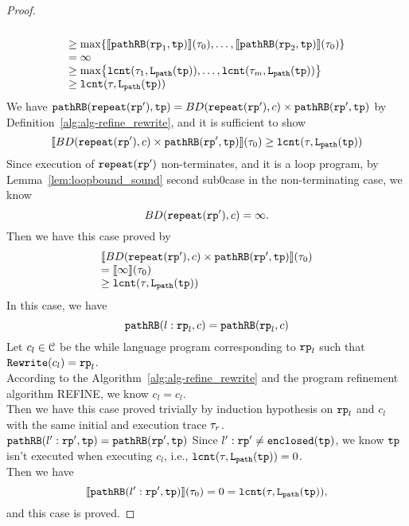 \begin{proof}
\[\begin{array}{l}
    \\
    \geq \max\left\{ \econfig{\inoutB(\rprog_1, \tpath)}(\trace_0), \ldots, \econfig{\inoutB(\rprog_2, \tpath)}(\trace_0)\right\}
    \\
    =  \infty
    \\
    \geq \max\left\{ \lcounter(\trace_1,  \pathl(\tpath)),  \ldots, \lcounter(\trace_m,  \pathl(\tpath))  \right\}
    \\
    \geq \lcounter(\trace, \pathl(\tpath))
    \end{array}
  \]
We have $\mathtt{pathRB}(\mathtt{repeat}(\mathtt{rp}'), \mathtt{tp}) = BD(\mathtt{repeat}(\mathtt{rp}'), c) \times \mathtt{pathRB}(\mathtt{rp}', \mathtt{tp})$
by Definition~\ref{alg:alg-refine_rewrite}, and
it is sufficient to show
\[
  \llbracket  BD(\mathtt{repeat}(\mathtt{rp}'), c) \times \mathtt{pathRB}(\mathtt{rp}', \mathtt{tp}) \rrbracket (\mathtt{\tau}_0) \geq \mathtt{lcnt}(\mathtt{\tau}, \mathtt{L}_{\mathtt{path}}(\mathtt{tp})) 
\]
Since execution of $\mathtt{repeat}(\mathtt{rp}')$ non-terminates, and it is a loop program,
by Lemma~\ref{lem:loopbound_sound} second sub0case in the non-terminating case, we know
\[
  BD(\mathtt{repeat}(\mathtt{rp}'), c) = \infty.
\]
Then we have this case proved by
\[
  \begin{array}{l}
  \llbracket BD(\mathtt{repeat}(\mathtt{rp}'), c) \times \mathtt{pathRB}(\mathtt{rp}', \mathtt{tp}) \rrbracket(\mathtt{\tau}_0) 
  \\
  =
  \llbracket  \infty  \rrbracket(\mathtt{\tau}_0) 
  \\
  \geq \mathtt{lcnt}(\mathtt{\tau}, \mathtt{L}_{\mathtt{path}}(\mathtt{tp})) 
  \end{array}
  \]
  In this case, we have
  \[
    \mathtt{pathRB}(l: \mathtt{rp}_l, c) = \mathtt{pathRB}(\mathtt{rp}_l, c)
  \]
  Let $c_l \in \mathcal{C}$ be the while language program corresponding to $\mathtt{rp}_l$ such that $\mathtt{Rewrite}(c_l) = \mathtt{rp}_l$.
  \\
  According to the Algorithm~\ref{alg:alg-refine_rewrite} and the program refinement algorithm REFINE, we know
  $c_l = c_l$.
  \\
  Then we have this case proved trivially by induction hypothesis on $\mathtt{rp}_l$ and $c_l$ with the same initial and execution trace $\mathtt{\tau}_r$.
$\mathtt{pathRB}(l': \mathtt{rp}', \mathtt{tp}) = \mathtt{pathRB}(\mathtt{rp}', \mathtt{tp})$ 
Since $l': \mathtt{rp}' \neq \mathtt{enclosed}(\mathtt{tp})$, we know $\mathtt{tp}$ isn't executed when executing $c_l$, i.e., $\mathtt{lcnt}(\mathtt{\tau}, \mathtt{L}_{\mathtt{path}}(\mathtt{tp})) = 0$.
\\
Then we have
\[
  \llbracket \mathtt{pathRB}(l': \mathtt{rp}', \mathtt{tp}) \rrbracket(\mathtt{\tau}_0) = 0 = \mathtt{lcnt}(\mathtt{\tau}, \mathtt{L}_{\mathtt{path}}(\mathtt{tp})),
  \]
and this case is proved.
\end{proof}



